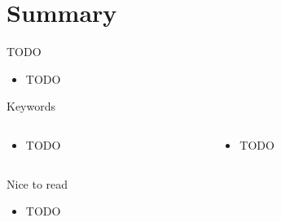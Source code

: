 \documentclass{curs}
\begin{document}
\section{Summary}

\begin{frame}{TODO}
  \begin{itemize}
    \item TODO
  \end{itemize}
\end{frame}

\begin{frame}{Keywords}
  \begin{columns}
    \begin{column}{0.5\textwidth}
      \begin{itemize}
        \item TODO
      \end{itemize}
    \end{column}
    \begin{column}{0.5\textwidth}
      \begin{itemize}
        \item TODO
      \end{itemize}
    \end{column}
  \end{columns}
\end{frame}

\begin{frame}{Nice to read}
  \begin{itemize}
    \item TODO
  \end{itemize}
\end{frame}
\end{document}
